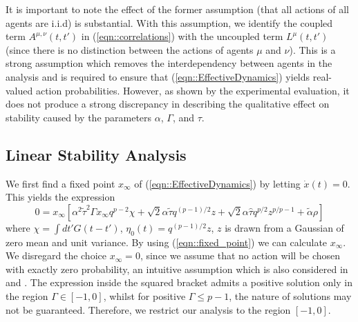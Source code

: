 \documentclass[sigconf,anonymous]{aamas}
\newcommand{\talpha}{\tilde{\alpha}}
\newcommand{\ttau}{\tilde{\tau}}
\newcommand{\htau}{\hat{\tau}}
\newcommand{\xfixed}{x_\infty}
\begin{document}
It is important to note the effect of the former assumption (that all
actions of all agents are i.i.d) is substantial. With this assumption,
we identify the coupled term $A^{\mu, \nu} (t, t')$ in
(\ref{eqn::correlations}) with the uncoupled term $L^\mu (t, t')$
(since there is no distinction between the actions of agents $\mu$ and
$\nu$). This is a strong assumption which removes the interdependency
between agents in the analysis and is required to ensure that (\ref{eqn::EffectiveDynamics}) yields real-valued action probabilities. However, as shown by the experimental
evaluation, it does not produce a strong discrepancy in describing the
qualitative effect on stability caused by the parameters $\alpha$, $\Gamma$, and $\tau$.

\subsection{Linear Stability Analysis}

We first find a fixed point $\xfixed$ of (\ref{eqn::EffectiveDynamics}) by letting $\dot{x}(t)= 0$. This yields the expression 
%
\begin{equation}
    0  = \xfixed [ \alpha^2 \ttau^2 \Gamma \xfixed q^{p-2} \chi + \sqrt{2} \alpha \ttau q^{(p-1)/2}z + \sqrt{2} \alpha \htau q^{p/2} z^{p/p-1} + \talpha \rho]
    \label{eqn::fixed_point}
\end{equation}
%
where $\chi = \int dt' G(t - t')$, $\eta_0(t) = q^{(p-1)/2}z$, $z$ is
drawn from a Gaussian of zero mean and unit variance. By using (\ref{eqn::fixed_point}) we can
calculate $\xfixed$. We disregard the choice $\xfixed = 0$, since we
assume that no action will be chosen with exactly zero probability, an
intuitive assumption which is also considered in \cite{Sanders2018}
and \cite{Coolen2005}. The expression inside the squared bracket
admits a positive solution only in the region $\Gamma \in [-1, 0]$,
whilst for positive $\Gamma \leq p-1$, the nature of solutions may
not be guaranteed. Therefore, we restrict our analysis to the region
$[-1, 0]$.
\end{document}
